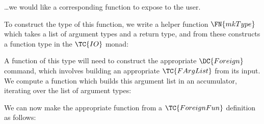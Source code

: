 \noindent
\ldots we would like a corresponding function to expose to the user.


To construct the type of this function, we write a helper function
$\FN{mkType}$ which takes a list of argument types and a return type,
and from these constructs a function type in the $\TC{IO}$ monad:


A function of this type will need to construct the appropriate
$\DC{Foreign}$ command, which involves building an appropriate
$\TC{FArgList}$ from its input. We compute a function which builds
this argument list in an accumulator, iterating over the list of
argument types:


We can now make the appropriate \Idris{} function from a
$\TC{ForeignFun}$ definition as follows:


